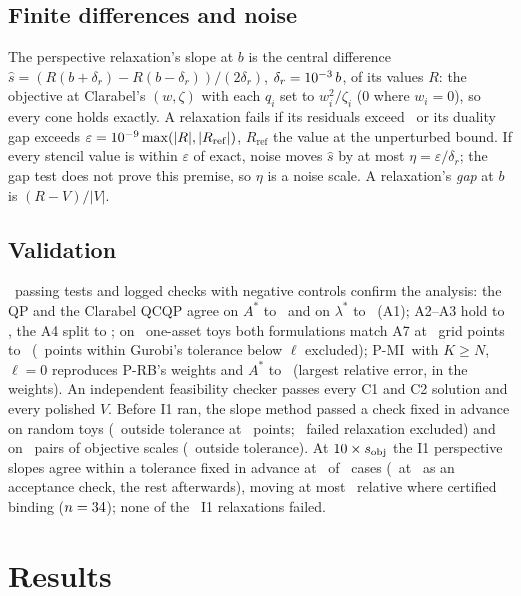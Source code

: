 \documentclass[conference]{IEEEtran}
\newcommand{\pmi}{\mbox{P-MI}}
\newcommand{\prb}{\mbox{P-RB}}
\begin{document}
\subsection{Finite differences and noise}
The perspective relaxation's slope at $b$ is the central difference $\hat s=(R(b+\delta_r)-R(b-\delta_r))/(2\delta_r)$, $\delta_r=10^{-3}\,b$, of its values $R$: the objective at Clarabel's $(w,\zeta)$ with each $q_i$ set to $w_i^2/\zeta_i$ (0 where $w_i=0$), so every cone holds exactly. A relaxation fails if its residuals exceed \RelaxResidual\ or its duality gap exceeds $\varepsilon=10^{-9}\max(|R|,|R_{\mathrm{ref}}|)$, $R_{\mathrm{ref}}$ the value at the unperturbed bound. If every stencil value is within $\varepsilon$ of exact, noise moves $\hat s$ by at most $\eta=\varepsilon/\delta_r$; the gap test does not prove this premise, so $\eta$ is a noise scale. A relaxation's \emph{gap} at $b$ is $(R-V)/|V|$.

\subsection{Validation}
\TestsPassed\ passing tests and logged checks with negative controls confirm the analysis: the QP and the Clarabel QCQP agree on $A^*$ to \KFourA\ and on $\lambda^*$ to \KFourLam\ (A1); A2--A3 hold to \KSixA, the A4 split to \KFiveSplit; on \KNineToys\ one-asset toys both formulations match A7 at \KNinePoints\ grid points to \KNineErr\ (\KNineBand\ points within Gurobi's tolerance below $\ell$ excluded); \pmi\ with $K\ge N$, $\ell=0$ reproduces \prb's weights and $A^*$ to \KThirteen\ (largest relative error, in the weights). An independent feasibility checker passes every C1 and C2 solution and every polished $V$. Before I1 ran, the slope method passed a check fixed in advance on random toys (\KTwentyNineCMisses\ outside tolerance at \KTwentyNineCPoints\ points; \KTwentyNineCToyFailed\ failed relaxation excluded) and on \KTwentyNineCPairs\ pairs of objective scales (\KTwentyNineCPairMisses\ outside tolerance). At $10\times s_{\mathrm{obj}}$ the I1 perspective slopes agree within a tolerance fixed in advance at \SlopeScaleWithin\ of \SlopeScaleN\ cases (\KTwentyNineBN\ at \DIa\ as an acceptance check, the rest afterwards), moving at most \SlopeScaleBindDiff\ relative where certified binding ($n=34$); none of the \PerspRelax\ I1 relaxations failed.

\section{Results}
\label{sec:results}
\end{document}
